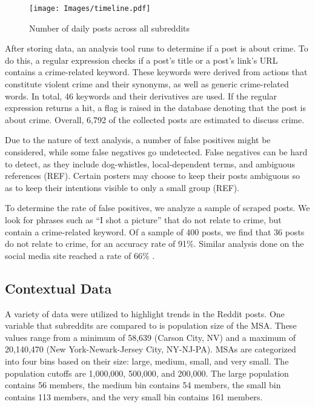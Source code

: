 \documentclass[12pt,oneside, letterpaper]{book}
\begin{document}
\begin{figure}[ht]
    \texttt{[image: Images/timeline.pdf]}
    \caption{Number of daily posts across all subreddits}
    \label{fig:line-1}
\end{figure}

\par After storing data, an analysis tool runs to determine if a post is about crime. To do this, a regular expression checks if a post's title or a post's link's URL contains a crime-related keyword. These keywords were derived from actions that constitute violent crime and their synonyms, as well as generic crime-related words. In total, 46 keywords and their derivatives are used. If the regular expression returns a hit, a flag is raised in the database denoting that the post is about crime. Overall, 6,792 of the collected posts are estimated to discuss crime.

\par Due to the nature of text analysis, a number of false positives might be considered, while some false negatives go undetected. False negatives can be hard to detect, as they include dog-whistles, local-dependent terms, and ambiguous references (REF). Certain posters may choose to keep their posts ambiguous so as to keep their intentions visible to only a small group (REF).

\par To determine the rate of false positives, we analyze a sample of scraped posts. We look for phrases such as ``I shot a picture'' that do not relate to crime, but contain a crime-related keyword. Of a sample of 400 posts, we find that 36 posts do not relate to crime, for an accuracy rate of 91\%. Similar analysis done on the social media site reached a rate of 66\% \cite{curiel}.

\subsection{Contextual Data}
\par A variety of data were utilized to highlight trends in the Reddit posts. One variable that subreddits are compared to is population size of the MSA. These values range from a minimum of 58,639 (Carson City, NV) and a maximum of 20,140,470 (New York-Newark-Jersey City, NY-NJ-PA). MSAs are categorized into four bins based on their size: large, medium, small, and very small. The population cutoffs are 1,000,000, 500,000, and 200,000. The large population contains 56 members, the medium bin contains 54 members, the small bin contains 113 members, and the very small bin contains 161 members.
\end{document}
